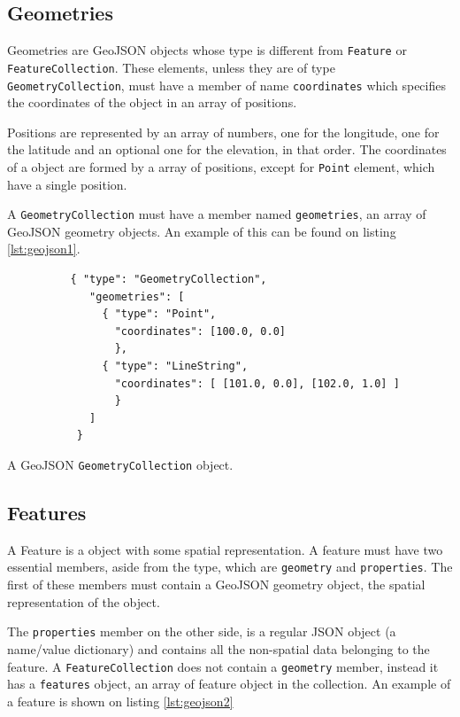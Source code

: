 \subsection*{Geometries}

Geometries are GeoJSON objects whose type is different from \texttt{Feature} or \texttt{FeatureCollection}. These elements, unless they are of type \texttt{GeometryCollection}, must have a member of name \texttt{coordinates} which specifies the coordinates of the object in an array of positions.

Positions are represented by an array of numbers, one for the longitude, one for the latitude and an optional one for the elevation, in that order. The coordinates of a object are formed by a array of positions, except for \texttt{Point} element, which have a single position.

A \texttt{GeometryCollection} must have a member named \texttt{geometries}, an array of GeoJSON geometry objects. An example of this can be found on listing \ref{lst:geojson1}.

\begin{listing}[ht]\centering
  \begin{minipage}{.6\textwidth}
    \begin{verbatim}
	      { "type": "GeometryCollection",
	         "geometries": [
	           { "type": "Point",
	             "coordinates": [100.0, 0.0]
	             },
	           { "type": "LineString",
	             "coordinates": [ [101.0, 0.0], [102.0, 1.0] ]
	             }
	         ]
	       }
    \end{verbatim}
  \end{minipage}
  \caption{A GeoJSON \texttt{GeometryCollection} object.}\label{lst:geojson1}
\end{listing}

\subsection*{Features}

A Feature is a object with some spatial representation. A feature must have two essential members, aside from the type, which are \texttt{geometry} and \texttt{properties}. The first of these members must contain a GeoJSON geometry object, the spatial representation of the object.

The \texttt{properties} member on the other side, is a regular JSON object (a name/value dictionary) and contains all the non-spatial data belonging to the feature. A \texttt{FeatureCollection} does not contain a \texttt{geometry} member, instead it has a \texttt{features} object, an array of feature object in the collection. An example of a feature is shown on listing \ref{lst:geojson2}

